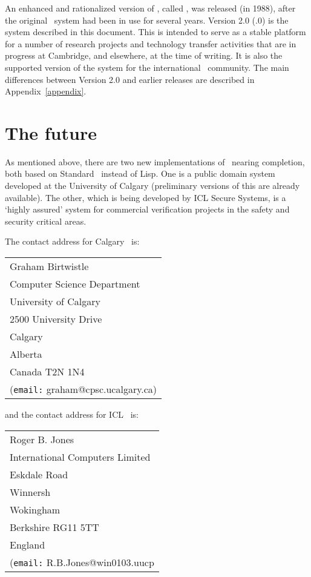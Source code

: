 An enhanced and rationalized version of \HOL, called , was released (in
1988), after the original \HOL\ system had been in use for several years.   Version 2.0 (.0) is the system described in this document. This
is intended to serve as a stable platform for a number of research projects and
technology transfer activities that are in progress at Cambridge, and
elsewhere, at the time of writing.  It is also the supported version of the
system for the international \HOL\ community.  The main differences between
Version 2.0 and earlier releases are described in Appendix~\ref{appendix}.


\section*{The future}

As mentioned above, there are two new implementations of \HOL\ nearing
completion, both based on Standard \ML\ instead of Lisp.  One is a
public domain system developed at the University of Calgary
(preliminary versions of this are already available). The other, which
is being developed by ICL Secure Systems, is a `highly assured' system
for commercial verification projects in the safety and security
critical areas.

The contact address for Calgary \HOL\ is:

\begin{center}
\begin{tabular}{l}
Graham Birtwistle\\ 
Computer Science Department\\
University of Calgary\\
2500 University Drive\\
Calgary\\
Alberta\\
Canada T2N 1N4\\[2mm]
({\tt email:} graham@cpsc.ucalgary.ca)
\end{tabular}
\end{center}

\noindent and the contact address for ICL \HOL\ is:
\begin{center}
\begin{tabular}{l}
Roger B. Jones \\
International Computers Limited\\
Eskdale Road\\
Winnersh\\
Wokingham\\
Berkshire  RG11 5TT\\
England\\[2mm]
({\tt email:} R.B.Jones@win0103.uucp
\end{tabular}
\end{center}


